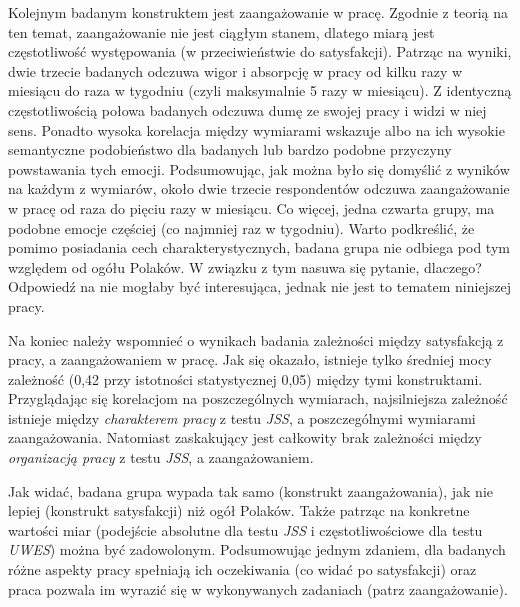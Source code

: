 Kolejnym badanym konstruktem jest zaangażowanie w pracę. Zgodnie z teorią na ten temat, zaangażowanie nie jest ciągłym stanem, dlatego miarą jest częstotliwość występowania (w przeciwieństwie do satysfakcji). Patrząc na wyniki, dwie trzecie badanych odczuwa wigor i absorpcję w pracy od kilku razy w miesiącu do raza w tygodniu (czyli maksymalnie 5 razy w miesiącu). Z identyczną częstotliwością połowa badanych odczuwa dumę ze swojej pracy i widzi w niej sens. Ponadto wysoka korelacja między wymiarami wskazuje albo na ich wysokie semantyczne podobieństwo dla badanych lub bardzo podobne przyczyny powstawania tych emocji. Podsumowując, jak można było się domyślić z wyników na każdym z wymiarów, około dwie
trzecie respondentów odczuwa zaangażowanie w pracę od raza do pięciu razy w miesiącu. Co więcej, jedna czwarta grupy, ma podobne emocje częściej (co najmniej raz w tygodniu). Warto podkreślić, że pomimo posiadania cech charakterystycznych, badana grupa nie odbiega pod tym względem od ogółu Polaków. W związku z tym nasuwa się pytanie, dlaczego? Odpowiedź na nie mogłaby być interesująca, jednak nie jest to tematem niniejszej pracy. 

Na koniec należy wspomnieć o wynikach badania zależności między satysfakcją z pracy, a zaangażowaniem w pracę. Jak się okazało, istnieje tylko średniej mocy zależność (0,42 przy istotności statystycznej 0,05) między tymi konstruktami. Przyglądając się korelacjom na poszczególnych wymiarach, najsilniejsza zależność istnieje między \textit{charakterem pracy} z testu \emph{JSS}, a poszczególnymi wymiarami zaangażowania. Natomiast zaskakujący jest całkowity brak zależności między
\textit{organizacją pracy} z testu \emph{JSS}, a zaangażowaniem.

  Jak widać, badana grupa wypada tak samo (konstrukt zaangażowania), jak nie lepiej (konstrukt satysfakcji) niż ogół Polaków. Także patrząc na konkretne wartości miar (podejście absolutne dla testu \emph{JSS} i częstotliwościowe dla testu \emph{UWES}) można być zadowolonym. Podsumowując jednym zdaniem, dla badanych różne aspekty pracy spełniają ich oczekiwania (co widać po satysfakcji) oraz praca pozwala im wyrazić się w wykonywanych zadaniach (patrz zaangażowanie).

